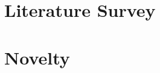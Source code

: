 \documentclass[conference]{IEEEtran}
\begin{document}
\section{Literature Survey}

\section{Novelty}







\end{document}
